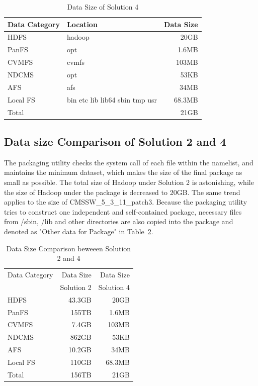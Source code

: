 \documentclass{acm_proc_article-sp}
\begin{document}
\begin{table}
    \centering
    \begin{tabular}{|l|l|r|}
    \hline
    Data Category &Location & Data Size \\ \hline
    HDFS & hadoop &20GB \\ \hline
    PanFS & opt & 1.6MB \\ \hline
    CVMFS & cvmfs &103MB \\ \hline 
    NDCMS & opt &53KB \\ \hline
    AFS & afs &34MB \\ \hline
    Local FS& bin etc lib lib64 sbin tmp usr&68.3MB \\ \hline
    Total & &21GB \\ \hline
    \end{tabular}
    \caption{Data Size of Solution 4}
    \label{table:datasize-3rd}
\end{table}    

\subsection{ Data size Comparison of Solution 2 and 4}

The packaging utility checks the system call of each file within the namelist,
and maintains the minimum dataset, which makes the size of the final package 
as small as possible. The total size of Hadoop under Solution 2 is astonishing,
while the size of Hadoop under the package is decreased to 20GB. The same trend
applies to the size of CMSSW\_5\_3\_11\_patch3. Because the packaging utility
tries to construct one independent and self-contained package, necessary files
from /sbin, /lib and other directories are also copied into the package and
denoted as "Other data for Package" in Table~\ref{table:datasize-2nd3rd}.

\begin{table}
    \centering
    \begin{tabular}{|l|r|r|}
    \hline
     Data Category & Data Size & Data Size \\
    & Solution 2 & Solution 4\\ \hline
    HDFS & 43.3GB & 20GB \\ \hline
    PanFS & 155TB & 1.6MB \\ \hline
    CVMFS & 7.4GB &103MB \\ \hline
    NDCMS & 862GB &53KB \\ \hline
    AFS & 10.2GB &34MB \\ \hline
    Local FS& 110GB&68.3MB \\ \hline
    Total & 156TB &21GB \\ \hline
    \end{tabular}
    \caption{Data Size Comparison beweeen Solution 2 and 4}
    \label{table:datasize-2nd3rd}
\end{table}
\end{document}
